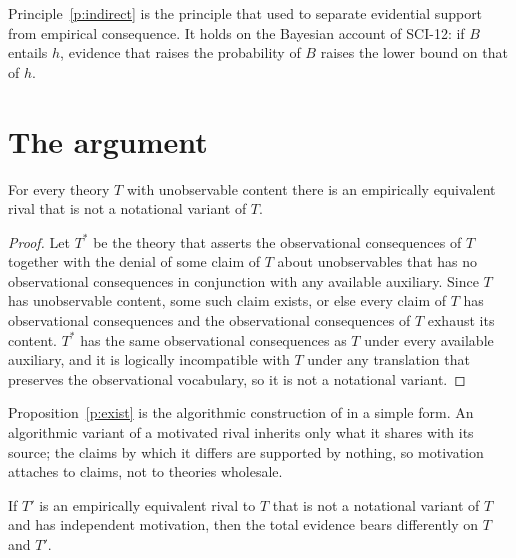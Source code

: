 \documentclass{situationist-preprint}
\begin{document}
Principle~\ref{p:indirect} is the principle that \citet{LaudanLeplin1991} used to separate evidential support from empirical consequence. It holds on the Bayesian account of SCI-12: if $B$ entails $h$, evidence that raises the probability of $B$ raises the lower bound on that of $h$.

\section{The argument}

\begin{proposition}\label{p:exist}
For every theory $T$ with unobservable content there is an empirically equivalent rival that is not a notational variant of $T$.
\end{proposition}

\begin{proof}
Let $T^*$ be the theory that asserts the observational consequences of $T$ together with the denial of some claim of $T$ about unobservables that has no observational consequences in conjunction with any available auxiliary. Since $T$ has unobservable content, some such claim exists, or else every claim of $T$ has observational consequences and the observational consequences of $T$ exhaust its content. $T^*$ has the same observational consequences as $T$ under every available auxiliary, and it is logically incompatible with $T$ under any translation that preserves the observational vocabulary, so it is not a notational variant.
\end{proof}

Proposition~\ref{p:exist} is the algorithmic construction of \citet{Kukla1993} in a simple form. An algorithmic variant of a motivated rival inherits only what it shares with its source; the claims by which it differs are supported by nothing, so motivation attaches to claims, not to theories wholesale.

\begin{lemma}[Discrimination]\label{l:discrim}
If $T'$ is an empirically equivalent rival to $T$ that is not a notational variant of $T$ and has independent motivation, then the total evidence bears differently on $T$ and $T'$.
\end{lemma}
\end{document}
